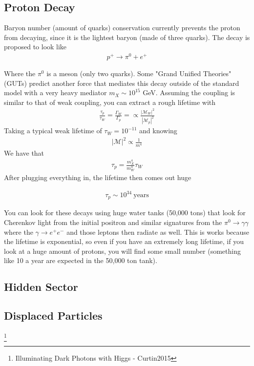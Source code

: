 \subsection{Proton Decay}
Baryon number (amount of quarks) conservation currently prevents the proton from decaying, since it is the lightest baryon (made of three quarks). The decay is proposed to look like
\begin{align}
    p^+ \rightarrow \pi^0 + e^+
\end{align}

Where the $\pi^0$ is a meson (only two quarks). Some "Grand Unified Theories" (GUTs) predict another force that mediates this decay outside of the standard model with a very heavy mediator $m_X \sim 10^{15}$ GeV. Assuming the coupling is similar to that of weak coupling, you can extract a rough lifetime with
\begin{align}
\frac{\tau_p}{\tau_W} = \frac{\Gamma_W}{\Gamma_p} = \propto\frac{|\mathcal{M}_W|^2}{|\mathcal{M}_p|^2}
\end{align}
Taking a typical weak lifetime of $\tau_W = 10^{-11}$ and knowing
\begin{align}
|\mathcal{M}|^2\propto\frac{1}{m^4}
\end{align}
We have that \begin{align}
\tau_p = \frac{m_X^4}{m_W^4}\tau_W
\end{align}
After plugging everything in, the lifetime then comes out huge

\begin{align}
    \tau_p \sim 10^{34} ~\textrm{years}
\end{align}

You can look for these decays using huge water tanks (50,000 tons) that look for Cherenkov light from the initial positron and similar signatures from the $\pi^0 \rightarrow \gamma\gamma$ where the $\gamma\rightarrow e^+e^-$ and those leptons then radiate as well. This is works because the lifetime is exponential, so even if you have an extremely long lifetime, if you look at a huge amount of protons, you will find some small number (something like 10 a year are expected in the 50,000 ton tank).

\subsection{Hidden Sector}

\subsection{Displaced Particles}
\footnote{Illuminating Dark Photons with Higgs - Curtin2015}

